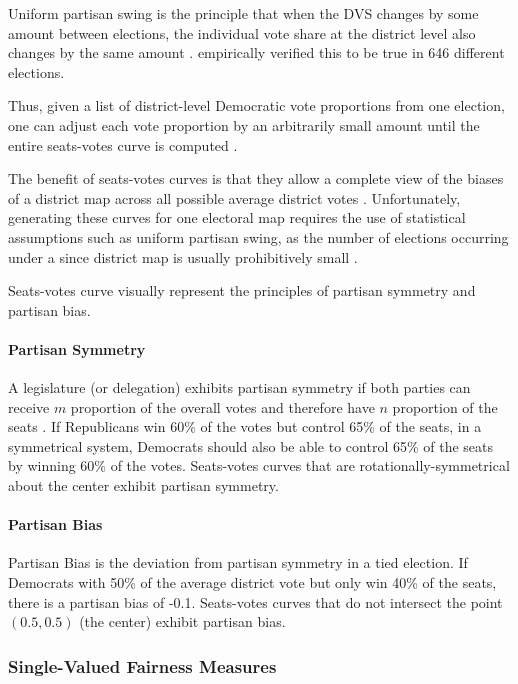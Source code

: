 Uniform partisan swing is the principle that when the DVS changes by some amount between elections, the individual vote share at the district level also changes by the same amount \parencite{tufte1973}. \textcite{katz2020} empirically verified this to be true in 646 different elections. 

Thus, given a list of district-level Democratic vote proportions from one election, one can adjust each vote proportion by an arbitrarily small amount until the entire seats-votes curve is computed \parencite{katz2020}.

The benefit of seats-votes curves is that they allow a complete view of the biases of a district map across all possible average district votes \parencite{gelman1994}. Unfortunately, generating these curves for one electoral map requires the use of statistical assumptions such as uniform partisan swing, as the number of elections occurring under a since district map is usually prohibitively small \parencite{warrington2018}.

Seats-votes curve visually represent the principles of partisan symmetry and partisan bias.

\paragraph{Partisan Symmetry}

A legislature (or delegation) exhibits partisan symmetry if both parties can receive $m$ proportion of the overall votes and therefore have $n$ proportion of the seats \parencite{katz2020}. If Republicans win 60\% of the votes but control 65\% of the seats, in a symmetrical system, Democrats should also be able to control 65\% of the seats by winning 60\% of the votes. Seats-votes curves that are rotationally-symmetrical about the center exhibit partisan symmetry.

\paragraph{Partisan Bias}
\label{sec:bias}

Partisan Bias is the deviation from partisan symmetry in a tied election. If Democrats with 50\% of the average district vote but only win 40\% of the seats, there is a partisan bias of -0.1. Seats-votes curves that do not intersect the point $(0.5, 0.5)$ (the center) exhibit partisan bias.

\subsubsection{Single-Valued Fairness Measures}


